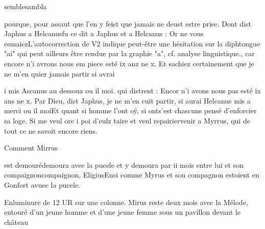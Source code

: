 \documentclass{article}
\begin{document}
\begin{pages}
                  semblesambla
               
                  pourque, pour assaut que l’en y feist 
                  que jamais ne deust estre prise. Dont 
                  dist Japhus a Helcanusfu ce dit a Japhus et a Helcanus : 
                  Or ne vous esmaiezL'autocorrection de V2 indique peut-être une hésitation sur la
                           diphtongue "ai" qui peut ailleurs être rendue par la graphie "a", cf.
                           analyse linguistique., car encore n’i avrons nous em piece esté
                           ix anz ne x. Et sachiez certainement que je ne m’en
                        quier jamais partir si avrai 
                           
                           i
                        mis Ascanus au dessouz ou il
                        moi.
                  qui distrent : Encor n'i avons nous
                        pas esté ix ans ne x. Par Dieu, dist Japhus, je ne m'en cuit partir, si aurai
                        Helcanus mis a merci ou il moiEt quant si homme l’ont oÿ, si 
                  onts'est chascuns pensé d’enforcier sa
               loge.
                  Si me veul 
                     ore
                  i poi d’eulz taire et veul 
                     repairiervenir a Myrrus, qui de tout ce ne savoit encore
                  riens. \pend
         
         
            
                  Comment Mirrus
                     
                        est demourédemoura avec la pucele et y demoura par
                        ii mois 
                        entre lui et son 
                           compaignoncompaignon, EligiusEnsi comme Myrus et son compagnon estoient en Gonfort avuec la
                     pucele.
            
               
               Enluminure de 12 UR sur une colonne. Mirus reste deux mois avec la Mélode,
                  entouré d’un jeune homme et d’une jeune femme sous un pavillon devant le
                  château
            
         
      
   

\end{pages}
\end{document}
